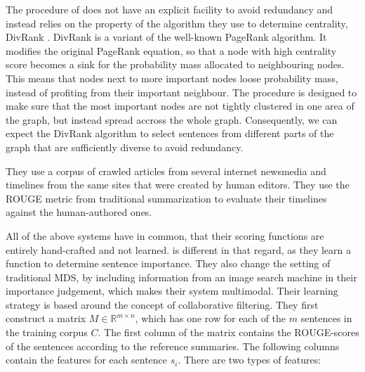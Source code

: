 \documentclass[a4paper,BCOR=10mm]{report}
\begin{document}
The procedure of \citet{yan-trans} does not have an explicit facility to avoid redundancy and instead relies on the property of the algorithm they use to determine centrality, DivRank \citep{divrank}. DivRank is a variant of the well-known PageRank \citep{pagerank} algorithm. It modifies the original PageRank equation, so that a node with high centrality score becomes a sink for the probability mass allocated to neighbouring nodes. This means that nodes next to more important nodes loose probability mass, instead of profiting from their important neighbour. The procedure is designed to make sure that the most important nodes are not tightly clustered in one area of the graph, but instead spread accross the whole graph. Consequently, we can expect the DivRank algorithm to select sentences from different parts of the graph that are sufficiently diverse to avoid redundancy.

They use a corpus of crawled articles from several internet newsmedia and timelines from the same sites that were created by human editors.
They use the ROUGE \citep{rouge} metric from traditional summarization to evaluate their timelines against the human-authored ones.





All of the above systems have in common, that their scoring functions are entirely hand-crafted and not learned.
\citet{multimodal} is different in that regard, as they learn a function to determine sentence importance. They also change the setting of traditional MDS, by including information from an image search machine in their importance judgement, which makes their system multimodal.
Their learning strategy is based around the concept of collaborative filtering.
They first construct a matrix $M \in \mathbb{R}^{m \times n}$, which has one row for each of the $m$ sentences in the training corpus $C$. The first column of the matrix contains the ROUGE-scores of the sentences according to the reference summaries. The following columns contain the features for each sentence $s_i$.
There are two types of features:
\end{document}
